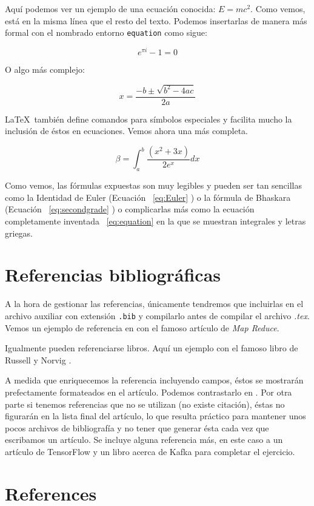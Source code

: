 \documentclass[review]{elsarticle}
\begin{document}
Aquí podemos ver un ejemplo de una ecuación conocida:  $E=mc^2$. Como vemos, está en la misma línea que el resto del texto. Podemos insertarlas de manera más formal con el nombrado entorno \texttt{equation} como sigue:

\begin{equation} \label{eq:Euler} 
  e^{\pi i} - 1 = 0
\end{equation}

O algo más complejo:

\begin{equation} \label{eq:secondgrade} 
  x = \frac{-b \pm{\sqrt{b^2 -4ac}}}{2a}
\end{equation}

\LaTeX\ también define comandos para símbolos especiales y facilita mucho la inclusión de éstos en ecuaciones. Vemos ahora una más completa.


\begin{equation} \label{eq:equation} 
  \beta = \int_{a}^{b}{\frac{(x^2 + 3x)}{2e^x}dx}
\end{equation}

Como vemos, las fórmulas expuestas son muy legibles y pueden ser tan sencillas como la Identidad de Euler (Ecuación ~\ref{eq:Euler} ) o la fórmula de Bhaskara (Ecuación ~\ref{eq:secondgrade} ) o complicarlas más como la ecuación completamente inventada ~\ref{eq:equation} en la que se muestran integrales y letras griegas. 


\section{Referencias bibliográficas}

A la hora de gestionar las referencias, únicamente tendremos que incluirlas en el archivo auxiliar con extensión \texttt{.bib} y compilarlo antes de compilar el archivo \textit{.tex}. Vemos un ejemplo de referencia en \cite{Dean:2004:MSD:1251254.1251264} con el famoso artículo de \textit{Map Reduce}.

Igualmente pueden referenciarse libros. Aquí un ejemplo con el famoso libro de Russell y Norvig \cite{Russell:2003:AIM:773294}.

A medida que enriquecemos la referencia incluyendo campos, éstos se mostrarán prefectamente formateados en el artículo. Podemos contrastarlo en \cite{Groman:1996:ESH:381984.381988}. Por otra parte si tenemos referencias que no se utilizan (no existe citación), éstas no figurarán en la lista final del artículo, lo que resulta práctico para mantener unos pocos archivos de bibliografía y no tener que generar ésta cada vez que escribamos un artículo. 
Se incluye alguna referencia más, en este caso a un artículo de TensorFlow \cite{tensorflow2015-whitepaper} y un libro acerca de Kafka \cite{Narkhede:2017:KDG:3175825} para completar el ejercicio. 
\section*{References}


\end{document}
